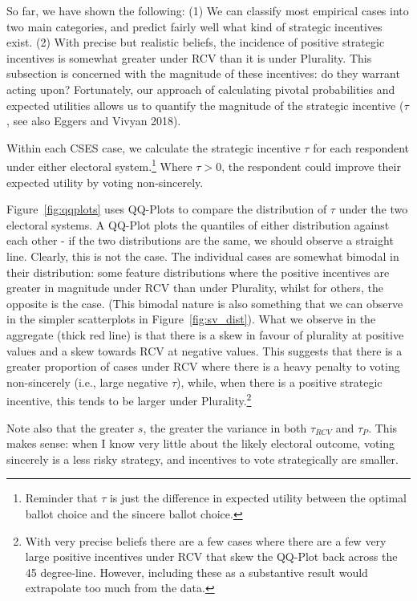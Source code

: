 \documentclass[11pt, letter]{article}
\begin{document}
So far, we have shown the following: (1) We can classify most empirical cases into two main categories, and predict fairly well what kind of strategic incentives exist. (2) With precise but realistic beliefs, the incidence of positive strategic incentives is somewhat greater under RCV than it is under Plurality. This subsection is concerned with the magnitude of these incentives: do they warrant acting upon? Fortunately, our approach of calculating pivotal probabilities and expected utilities allows us to quantify the magnitude of the strategic incentive ($\tau$, see also Eggers and Vivyan 2018). 

Within each CSES case, we calculate the strategic incentive $\tau$ for each respondent under either electoral system.\footnote{Reminder that $\tau$ is just the difference in expected utility between the optimal ballot choice and the sincere ballot choice.} Where $\tau > 0$, the respondent could improve their expected utility by voting non-sincerely.

Figure~\ref{fig:qqplots} uses QQ-Plots to compare the distribution of $\tau$ under the two electoral systems. A QQ-Plot plots the quantiles of either distribution against each other - if the two distributions are the same, we should observe a straight line. Clearly, this is not the case. The individual cases are somewhat bimodal in their distribution: some feature distributions where the positive incentives are greater in magnitude under RCV than under Plurality, whilst for others, the opposite is the case. (This bimodal nature is also something that we can observe in the simpler scatterplots in Figure~\ref{fig:sv_dist}). What we observe in the aggregate (thick red line) is that there is a skew in favour of plurality at positive values and a skew towards RCV at negative values. This suggests that there is a greater proportion of cases under RCV where there is a heavy penalty to voting non-sincerely (i.e., large negative $\tau$), while, when there is a positive strategic incentive, this tends to be larger under Plurality.\footnote{With very precise beliefs there are a few cases where there are a few very large positive incentives under RCV that skew the QQ-Plot back across the 45 degree-line. However, including these as a substantive result would extrapolate too much from the data.} 

Note also that the greater $s$, the greater the variance in both $\tau_{RCV}$ and  $\tau_{P}$. This makes sense: when I know very little about the likely electoral outcome, voting sincerely is a less risky strategy, and incentives to vote strategically are smaller. 
\end{document}
